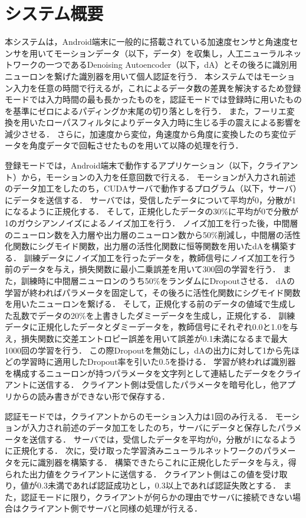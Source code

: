 \section{システム概要}
本システムは，Android端末に一般的に搭載されている加速度センサと角速度センサを用いてモーションデータ（以下，データ）を収集し，人工ニューラルネットワークの一つであるDenoising Autoencoder（以下，dA）とその後ろに識別用ニューロンを繋げた識別器を用いて個人認証を行う．
本システムではモーション入力を任意の時間で行えるが，これによるデータ数の差異を解決するため登録モードでは入力時間の最も長かったものを，認証モードでは登録時に用いたものを基準にゼロによるパディングか末尾の切り落としを行う．
また，フーリエ変換を用いたローパスフィルタによりデータ入力時に生じる手の震えによる影響を減少させる．
さらに，加速度から変位，角速度から角度に変換したのち変位データを角度データで回転させたものを用いて以降の処理を行う．

登録モードでは，Android端末で動作するアプリケーション（以下，クライアント）から，モーションの入力を任意回数で行える．
モーションが入力され前述のデータ加工をしたのち，CUDAサーバで動作するプログラム（以下，サーバ）にデータを送信する．
サーバでは，受信したデータについて平均が0，分散が1になるように正規化する．
そして，正規化したデータの30\%に平均が0で分散が1のガウシアンノイズによるノイズ加工を行う．
ノイズ加工を行った後，中間層のニューロン数を入力層や出力層のニューロン数から50\%削減し，中間層の活性化関数にシグモイド関数，出力層の活性化関数に恒等関数を用いたdAを構築する．
訓練データにノイズ加工を行ったデータを，教師信号にノイズ加工を行う前のデータを与え，損失関数に最小二乗誤差を用いて300回の学習を行う．
また，訓練時に中間層ニューロンのうち50\%をランダムにDropoutさせる．
dAの学習が終わればパラメータを固定して，その後ろに活性化関数にシグモイド関数を用いたニューロンを繋げる．
そして，正規化する前のデータの値域で生成した乱数でデータの20\%を上書きしたダミーデータを生成し，正規化する．
訓練データに正規化したデータとダミーデータを，教師信号にそれぞれ0.0と1.0を与え，損失関数に交差エントロピー誤差を用いて誤差が0.1未満になるまで最大1000回の学習を行う．
この際Dropoutを無効にし，dAの出力に対して1から先ほどの学習時に適用したDropout率を引いた0.5を掛ける．
学習が終われば識別器を構成するニューロンが持つパラメータを文字列として連結したデータをクライアントに送信する．
クライアント側は受信したパラメータを暗号化し，他アプリからの読み書きができない形で保存する．

認証モードでは，クライアントからのモーション入力は1回のみ行える．
モーションが入力され前述のデータ加工をしたのち，サーバにデータと保存したパラメータを送信する．
サーバでは，受信したデータを平均が0，分散が1になるように正規化する．
次に，受け取った学習済みニューラルネットワークのパラメータを元に識別器を構築する．
構築できたらこれに正規化したデータを与え，得られた出力値をクライアントに送信する．
クライアント側はこの値を受け取り，値が0.3未満であれば認証成功とし，0.3以上であれば認証失敗とする．
また，認証モードに限り，クライアントが何らかの理由でサーバに接続できない場合はクライアント側でサーバと同様の処理が行える．
